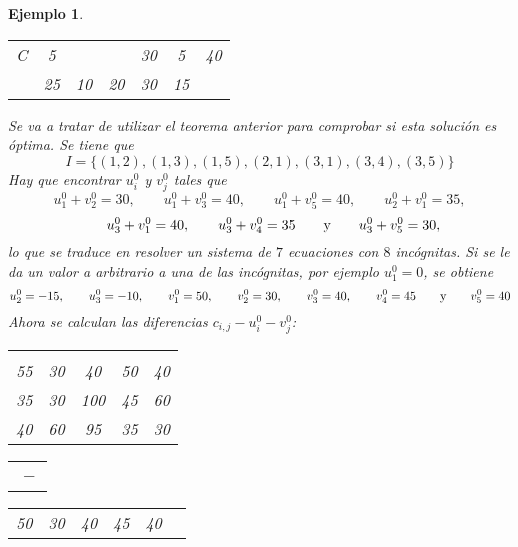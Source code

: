 \documentclass[11pt]{report}
\theoremstyle{mytheorem}
\theoremstyle{mydefinition}
\theoremstyle{myexample}
\newtheorem*{example}{Ejemplo}
\begin{document}
\begin{example}
\begin{center}
\begin{tabular}{ccccccc}
    \multicolumn{1}{c|}{C} & \multicolumn{1}{c}{5} & \multicolumn{1}{c}{} & \multicolumn{1}{c}{} &  \multicolumn{1}{c}{30} & \multicolumn{1}{c|}{5} & \multicolumn{1}{c}{40} \\[2pt] \cline{2-6}

    \multicolumn{1}{c}{} & \multicolumn{1}{c}{25} & \multicolumn{1}{c}{10} & \multicolumn{1}{c}{20} & \multicolumn{1}{c}{30} & \multicolumn{1}{c}{15} & \multicolumn{1}{c}{} \\
\end{tabular}
\end{center}
Se va a tratar de utilizar el teorema anterior para comprobar si esta solución es óptima. Se tiene que
\[I = \{(1,2),(1,3),(1,5),(2,1),(3,1),(3,4),(3,5)\}\]
Hay que encontrar $u^0_i$ y $v^0_j$ tales que
\[u^0_1+v^0_2=30,\qquad u^0_1+v^0_3=40,\qquad u^0_1+v^0_5=40,\qquad u^0_2+v^0_1=35,\]
\[\qquad u^0_3+v^0_1=40,\qquad u^0_3+v^0_4=35\qquad \textup{y} \qquad u^0_3+v^0_5=30,\]
lo que se traduce en resolver un sistema de $7$ ecuaciones con $8$ incógnitas. Si se le da un valor a arbitrario a una de las incógnitas, por ejemplo $u^0_1=0$, se obtiene
\[u^0_2=-15,\qquad u^0_3=-10, \qquad v^0_1=50,\qquad v^0_2=30, \qquad v^0_3=40, \qquad v^0_4=45 \qquad \textup{y} \qquad v^0_5=40\]
Ahora se calculan las diferencias $c_{i,j}-u^0_i-v^0_j$:
\begin{center}
\setlength\extrarowheight{2pt}
\begin{tabular}{ccccc}
    \multicolumn{1}{c}{} & \multicolumn{1}{c}{} & \multicolumn{1}{c}{} &  \multicolumn{1}{c}{} & \multicolumn{1}{c}{} \\
    \cline{1-5}

    \multicolumn{1}{|c}{55} & \multicolumn{1}{c}{30} & \multicolumn{1}{c}{40} &  \multicolumn{1}{c}{50} & \multicolumn{1}{c|}{40} \\

    \multicolumn{1}{|c}{35} & \multicolumn{1}{c}{30} & \multicolumn{1}{c}{100} &  \multicolumn{1}{c}{45} & \multicolumn{1}{c|}{60} \\
    
    \multicolumn{1}{|c}{40} & \multicolumn{1}{c}{60} & \multicolumn{1}{c}{95} &  \multicolumn{1}{c}{35} & \multicolumn{1}{c|}{30} \\[2pt] \cline{1-5}
\end{tabular}
\begin{tabular}{c}
    \multicolumn{1}{c}{} \\ 
    \multicolumn{1}{c}{} \\ 
    \multicolumn{1}{c}{$\ -$} \\ 
    \multicolumn{1}{c}{} \\ 
\end{tabular}
\setlength\extrarowheight{2pt}
\begin{tabular}{cccccc}
    \multicolumn{1}{c}{50} & \multicolumn{1}{c}{30} & \multicolumn{1}{c}{40} &  \multicolumn{1}{c}{45} & \multicolumn{1}{c}{40} & \multicolumn{1}{c}{} \\ \cline{1-5}


\end{tabular}
\end{center}
\end{example}
\end{document}
